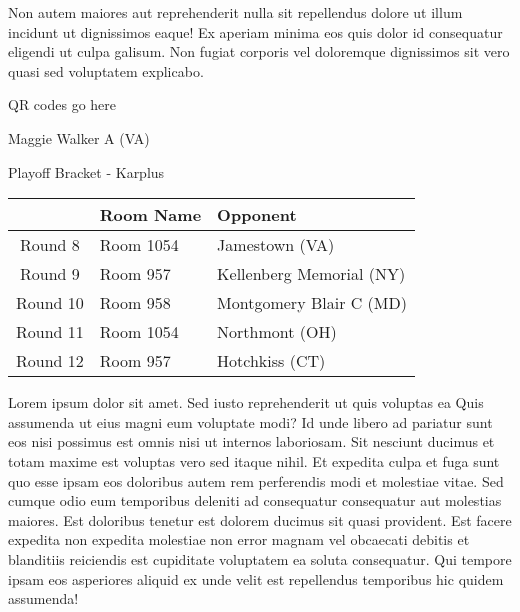 \documentclass{article}%
\begin{document}
\newline%
Non autem maiores aut reprehenderit nulla sit repellendus dolore ut illum incidunt ut dignissimos eaque! Ex aperiam minima eos quis dolor id consequatur eligendi ut culpa galisum. Non fugiat corporis vel doloremque dignissimos sit vero quasi sed voluptatem explicabo.\newline%
\newline%
%
\vspace*{30pt}%
\begin{center}%
\begin{Huge}%
QR codes go here%
\end{Huge}%
\end{center}%
\newpage%
\begin{center}%
\begin{Huge}%
Maggie Walker A (VA)%
\end{Huge}%
\vspace*{8pt}%
\linebreak%
\begin{Large}%
Playoff Bracket {-} Karplus%
\end{Large}%
\end{center}%
\begin{tabularx}{\textwidth}{|c|Y|Y|}%
\hline%
&Room Name&Opponent\\%
\hline%
Round 8&Room 1054&Jamestown (VA)\\%
Round 9&Room 957&Kellenberg Memorial (NY)\\%
Round 10&Room 958&Montgomery Blair C (MD)\\%
Round 11&Room 1054&Northmont (OH)\\%
Round 12&Room 957&Hotchkiss (CT)\\%
\hline%
\end{tabularx}%
\vspace*{8pt}%
\linebreak%
\newline%
\newline%
Lorem ipsum dolor sit amet. Sed iusto reprehenderit ut quis voluptas ea Quis assumenda ut eius magni eum voluptate modi? Id unde libero ad pariatur sunt eos nisi possimus est omnis nisi ut internos laboriosam. Sit nesciunt ducimus et totam maxime est voluptas vero sed itaque nihil. Et expedita culpa et fuga sunt quo esse ipsam eos doloribus autem rem perferendis modi et molestiae vitae.\newline%
\newline%
Sed cumque odio eum temporibus deleniti ad consequatur consequatur aut molestias maiores. Est doloribus tenetur est dolorem ducimus sit quasi provident. Est facere expedita non expedita molestiae non error magnam vel obcaecati debitis et blanditiis reiciendis est cupiditate voluptatem ea soluta consequatur. Qui tempore ipsam eos asperiores aliquid ex unde velit est repellendus temporibus hic quidem assumenda!\newline%
\end{document}
